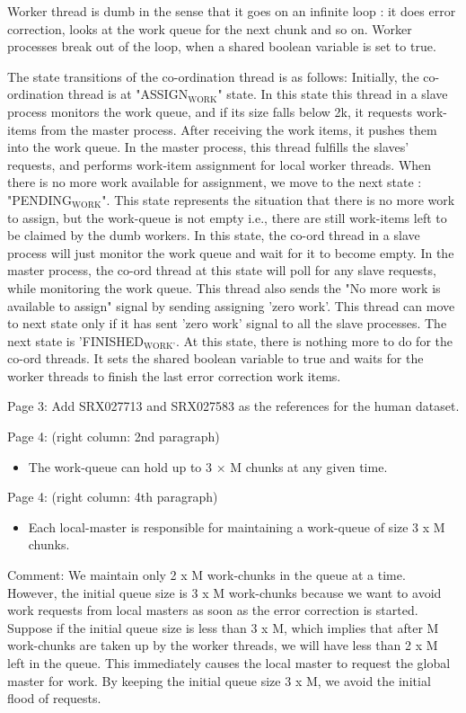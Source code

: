 \documentclass[integrals, nointegrals, article, 12pt, a4paper]{article}
\begin{document}
Worker thread is dumb in the sense that it goes on an infinite loop : it
does error correction, looks at the work queue for the next chunk and so
on. Worker processes break out of the loop, when a shared boolean
variable is set to true.

The state transitions of the co-ordination thread is as follows:
Initially, the co-ordination thread is at "ASSIGN$_{\text{WORK}}$" state. In this
state this thread in a slave process monitors the work queue, and if its
size falls below 2k, it requests work-items from the master
process. After receiving the work items, it pushes them into the work
queue. In the master process, this thread fulfills the slaves' requests,
and performs work-item assignment for local worker threads. When there
is no more work available for assignment, we move to the next state :
"PENDING$_{\text{WORK}}$". This state represents the situation that there is no
more work to assign, but the work-queue is not empty i.e., there are
still work-items left to be claimed by the dumb workers. In this state,
the co-ord thread in a slave process will just monitor the work queue
and wait for it to become empty. In the master process, the co-ord
thread at this state will poll for any slave requests, while monitoring
the work queue. This thread also sends the "No more work is available to
assign" signal by sending assigning 'zero work'. This thread can move to
next state only if it has sent 'zero work' signal to all the slave
processes. The next state is 'FINISHED$_{\text{WORK'}}$. At this state, there is
nothing more to do for the co-ord threads. It sets the shared boolean
variable to true and waits for the worker threads to finish the last
error correction work items.




Page 3:
Add SRX027713 and SRX027583 as the references for the human dataset.

Page 4: (right column: 2nd paragraph)
\begin{itemize}
\item The work-queue can hold up to 3 × M chunks at any given time.
\end{itemize}
Page 4: (right column: 4th paragraph)
\begin{itemize}
\item Each local-master is responsible for maintaining a work-queue of size
3 x M chunks.
\end{itemize}

Comment: We maintain only 2 x M work-chunks in the queue at a
time. However, the initial queue size is 3 x M work-chunks because we
want to avoid work requests from local masters as soon as the error
correction is started. Suppose if the initial queue size is less than 3
x M, which implies that after M work-chunks are taken up by the worker
threads, we will have less than 2 x M left in the queue. This
immediately causes the local master to request the global master for
work. By keeping the initial queue size 3 x M, we avoid the initial
flood of requests.
\end{document}
